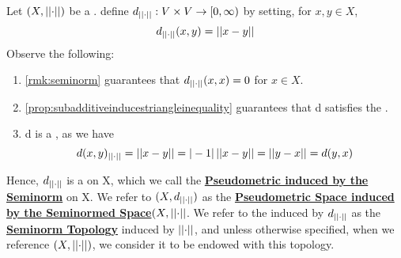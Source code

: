 \newcommand{\SeminormTopology}[0]{\textbf{\hyperref[def:seminormtopology]{Seminorm Topology}}\xspace}
\newcommand{\SeminormInducedPseudometric}[0]{\textbf{\hyperref[def:seminormtopology]{Pseudometric induced by the Seminorm}}\xspace}
\newcommand{\SeminormSpaceInducedPseudometricSpace}[0]{\textbf{\hyperref[def:seminormtopology]{Pseudometric Space induced by the Seminormed Space}}\xspace}

\begin{df}
\label{def:seminormtopology}
\rm
    Let $(X,\left|\left| \cdot \right|\right|)$ be a \SeminormedSpace.
    define $d_{\left|\left| \cdot \right|\right|}:V \times V \to [0,\infty)$  by setting,
    for $x,y \in X$, 
    \begin{equation}
    d_{\left|\left| \cdot \right|\right|}(x,y) = \left|\left| x-y \right|\right|
    \end{equation}
    Observe the following: 
    \begin{enumerate}
        \item \ref{rmk:seminorm} guarantees that $d_{\left|\left| \cdot \right|\right|}(x,x)=0$ for $x \in X$. 
        \item 
        \ref{prop:subadditiveinducestriangleinequality} guarantees that d satisfies the \TriangleInequality. 
        \item d is a \SymmetricMap, as we have 
    \begin{equation}
        d(x,y)_{\left|\left| \cdot \right|\right|}=\left|\left| x-y \right|\right|=|-1|\left|\left| x-y \right|\right|=\left|\left| y-x \right|\right|=d(y,x)
    \end{equation}
    \end{enumerate}

    Hence, $d_{\left|\left| \cdot \right|\right|}$  is a \Pseudometric on X, which we call the \SeminormInducedPseudometric on X. 
    We refer to $(X, d_{\left|\left| \cdot \right|\right|})$ as the \SeminormSpaceInducedPseudometricSpace $(X,\left|\left| \cdot \right|\right|$. 
    We refer to the \PseudometricTopology induced by $d_{\left|\left| \cdot \right|\right|}$ as the \SeminormTopology induced by $\left|\left| \cdot \right|\right|$, and unless otherwise specified, when we reference $(X,\left|\left| \cdot \right|\right|)$, we consider it to be endowed with this topology. 

\end{df}
